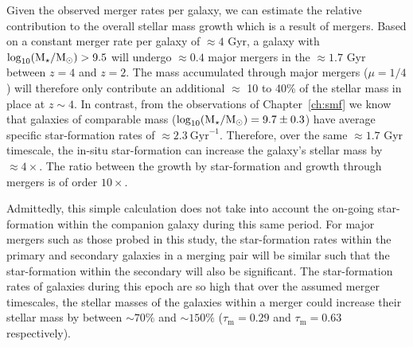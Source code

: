 Given the observed merger rates per galaxy, we can estimate the relative contribution to the overall stellar mass growth which is a result of mergers. Based on a constant merger rate per galaxy of $\approx 4$ Gyr, a galaxy with $\log_{10}(\text{M}_{\star} / \text{M}_{\odot}) > 9.5$ will undergo $\approx 0.4$ major mergers in the $\approx 1.7$ Gyr between $z = 4$ and $z=2$. The mass accumulated through major mergers ($\mu = 1/4$) will therefore only contribute an additional $\approx$ 10 to 40\% of the stellar mass in place at $z\sim4$. In contrast, from the observations of Chapter~\ref{ch:smf} we know that galaxies of comparable mass ($\log_{10}(\text{M}_{\star} / \text{M}_{\odot}) = 9.7 \pm 0.3$) have average specific star-formation rates of $\approx 2.3~\text{Gyr}^{-1}$. Therefore, over the same $\approx 1.7$ Gyr timescale, the in-situ star-formation can increase the galaxy's stellar mass by $\approx 4 \times$. The ratio between the growth by star-formation and growth through mergers is of order $10\times$.

Admittedly, this simple calculation does not take into account the on-going star-formation within the companion galaxy during this same period. For major mergers such as those probed in this study, the star-formation rates within the primary and secondary galaxies in a merging pair will be similar such that the star-formation within the secondary will also be significant. The star-formation rates of galaxies during this epoch are so high that over the assumed merger timescales, the stellar masses of the galaxies within a merger could increase their stellar mass by between $\sim70\%$ and $\sim150\%$ ($\tau_{\text{m}} = 0.29$ and $\tau_{\text{m}} = 0.63$ respectively).

